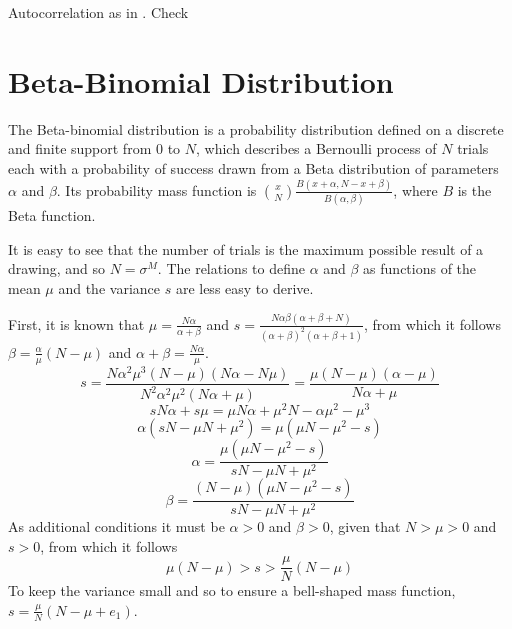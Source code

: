 \documentclass[a4paper, headings=standardclasses]{scrartcl}
\begin{document}
Autocorrelation as in \parencite{assenza2015}.
Check \Parencite[p.72]{dosi2017a}


\clearpage

\printbibliography

\clearpage

\appendix

\section{Beta-Binomial Distribution}
\label{sec:beta-binomial}
The Beta-binomial distribution is a probability distribution defined on a discrete and finite support from $0$ to $N$, which describes a Bernoulli process of $N$ trials each with a probability of success drawn from a Beta distribution of parameters $\alpha$ and $\beta$.
Its probability mass function is $\binom{x}{N}\frac{B(x+\alpha, N-x+\beta)}{B(\alpha,\beta)}$, where $B$ is the Beta function.

It is easy to see that the number of trials is the maximum possible result of a drawing, and so $N=\sigma^M$.
The relations to define $\alpha$ and $\beta$ as functions of the mean $\mu$ and the variance $s$ are less easy to derive.

First, it is known that $\mu = \frac{N \alpha}{\alpha + \beta}$  and $s=\frac{N\alpha\beta(\alpha + \beta + N)}{(\alpha+\beta)^2(\alpha+\beta+1)}$, from which it follows $\beta = \frac{\alpha}{\mu}(N-\mu)$ and $\alpha + \beta = \frac{N \alpha}{\mu}$.
$$s=\frac{N\alpha^2\mu^3(N-\mu)(N\alpha-N\mu)}{N^2\alpha^2\mu^2(N\alpha+\mu)} = \frac{\mu(N-\mu)(\alpha-\mu)}{N\alpha+\mu}$$
$$sN\alpha + s\mu = \mu N\alpha + \mu^2 N - \alpha \mu^2 - \mu^3$$
$$\alpha(sN -\mu N + \mu^2) = \mu(\mu N - \mu^2 -s)$$
$$\alpha=\frac{\mu(\mu N - \mu^2 -s)}{sN -\mu N + \mu^2}$$
$$\beta=\frac{(N-\mu)(\mu N - \mu^2 -s)}{sN -\mu N + \mu^2}$$
As additional conditions it must be $\alpha > 0$ and $\beta>0$, given that $N>\mu>0$ and $s>0$, from which it follows
$$\mu(N-\mu) > s > \frac{\mu}{N}(N-\mu)$$
To keep the variance small and so to ensure a bell-shaped mass function, $s=\frac{\mu}{N}(N-\mu+e_1)$.
\end{document}
